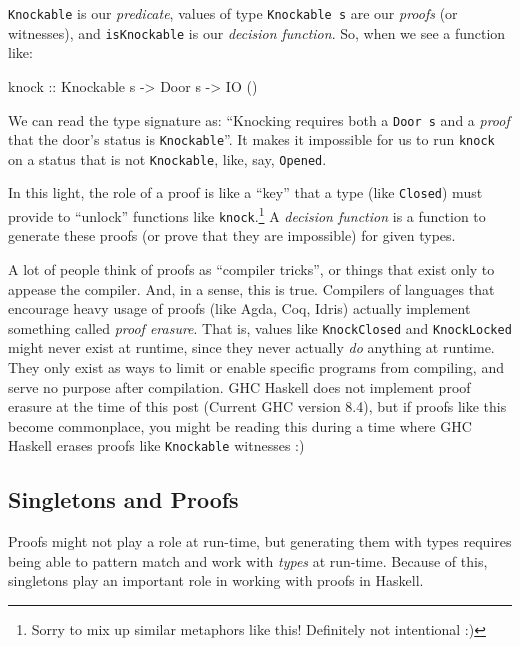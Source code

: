 \documentclass[]{article}
\newenvironment{Shaded}{}{}
\newcommand{\DataTypeTok}[1]{\textcolor[rgb]{0.56,0.13,0.00}{#1}}
\newcommand{\NormalTok}[1]{#1}
\newcommand{\OtherTok}[1]{\textcolor[rgb]{0.00,0.44,0.13}{#1}}
\begin{document}
\texttt{Knockable} is our \emph{predicate}, values of type \texttt{Knockable\ s}
are our \emph{proofs} (or witnesses), and \texttt{isKnockable} is our
\emph{decision function}. So, when we see a function like:

\begin{Shaded}
\begin{Highlighting}[]
\OtherTok{knock ::} \DataTypeTok{Knockable}\NormalTok{ s }\OtherTok{->} \DataTypeTok{Door}\NormalTok{ s }\OtherTok{->} \DataTypeTok{IO}\NormalTok{ ()}
\end{Highlighting}
\end{Shaded}

We can read the type signature as: ``Knocking requires both a \texttt{Door\ s}
and a \emph{proof} that the door's status is \texttt{Knockable}''. It makes it
impossible for us to run \texttt{knock} on a status that is not
\texttt{Knockable}, like, say, \texttt{\textquotesingle{}Opened}.

In this light, the role of a proof is like a ``key'' that a type (like
\texttt{\textquotesingle{}Closed}) must provide to ``unlock'' functions like
\texttt{knock}.\footnote{Sorry to mix up similar metaphors like this! Definitely
  not intentional :)} A \emph{decision function} is a function to generate these
proofs (or prove that they are impossible) for given types.

A lot of people think of proofs as ``compiler tricks'', or things that exist
only to appease the compiler. And, in a sense, this is true. Compilers of
languages that encourage heavy usage of proofs (like Agda, Coq, Idris) actually
implement something called \emph{proof erasure}. That is, values like
\texttt{KnockClosed} and \texttt{KnockLocked} might never exist at runtime,
since they never actually \emph{do} anything at runtime. They only exist as ways
to limit or enable specific programs from compiling, and serve no purpose after
compilation. GHC Haskell does not implement proof erasure at the time of this
post (Current GHC version 8.4), but if proofs like this become commonplace, you
might be reading this during a time where GHC Haskell erases proofs like
\texttt{Knockable} witnesses :)

\hypertarget{singletons-and-proofs}{%
\subsection{Singletons and Proofs}\label{singletons-and-proofs}}

Proofs might not play a role at run-time, but generating them with types
requires being able to pattern match and work with \emph{types} at run-time.
Because of this, singletons play an important role in working with proofs in
Haskell.
\end{document}
